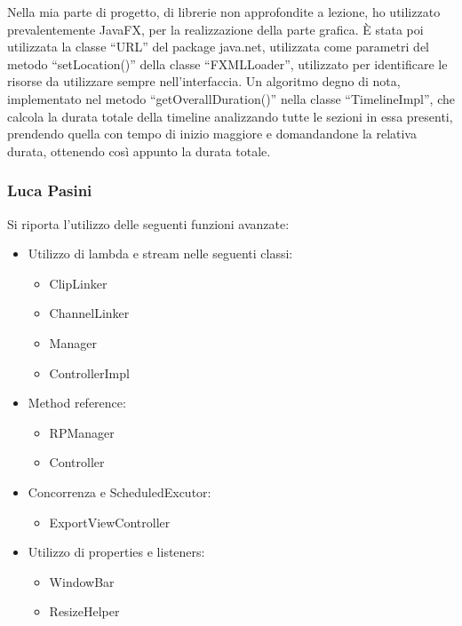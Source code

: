 \documentclass[a4paper,12pt]{report}
\begin{document}
Nella mia parte di progetto, di librerie non approfondite a lezione, ho utilizzato prevalentemente JavaFX, per la realizzazione della parte grafica. È stata poi utilizzata la classe “URL” del package java.net, utilizzata come parametri del metodo “setLocation()” della classe “FXMLLoader”, utilizzato per identificare le risorse da utilizzare sempre nell’interfaccia.
Un algoritmo degno di nota, implementato nel metodo “getOverallDuration()” nella classe “TimelineImpl”, che calcola la durata totale della timeline analizzando tutte le sezioni in essa presenti, prendendo quella con tempo di inizio maggiore e domandandone la relativa durata, ottenendo così appunto la durata totale.
\endsubsubsection

\subsubsection{Luca Pasini}
Si riporta l’utilizzo delle seguenti funzioni avanzate:
\begin{itemize}
    \item Utilizzo di lambda e stream nelle seguenti classi:
    \begin{itemize}
        \item ClipLinker
        \item ChannelLinker
        \item Manager
        \item ControllerImpl
    \end{itemize}
    \item Method reference:
    \begin{itemize}
        \item RPManager
        \item Controller
    \end{itemize}
    \item Concorrenza e ScheduledExcutor:
    \begin{itemize}
        \item ExportViewController
    \end{itemize}
    \item Utilizzo di properties e listeners:
    \begin{itemize}
        \item WindowBar
        \item ResizeHelper
    \end{itemize}
\end{itemize}
\end{document}
